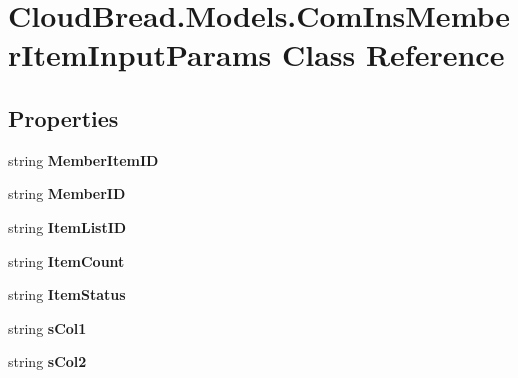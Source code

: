 \hypertarget{a00050}{}\section{Cloud\+Bread.\+Models.\+Com\+Ins\+Member\+Item\+Input\+Params Class Reference}
\label{a00050}
\subsection*{Properties}
\begin{DoxyCompactItemize}
\item 
string {\bfseries Member\+Item\+ID}\hypertarget{a00050_a3fea6cfe5f10ea9cf6c86f6f6ba63970}{}\label{a00050_a3fea6cfe5f10ea9cf6c86f6f6ba63970}

\item 
string {\bfseries Member\+ID}\hypertarget{a00050_a08770abad05bca194bb16c216680e0d2}{}\label{a00050_a08770abad05bca194bb16c216680e0d2}

\item 
string {\bfseries Item\+List\+ID}\hypertarget{a00050_aa1ccce901aa780f842db85153fa40849}{}\label{a00050_aa1ccce901aa780f842db85153fa40849}

\item 
string {\bfseries Item\+Count}\hypertarget{a00050_a7463ab9c8c9b0941b55ec993a1b43954}{}\label{a00050_a7463ab9c8c9b0941b55ec993a1b43954}

\item 
string {\bfseries Item\+Status}\hypertarget{a00050_a13818e61f93c09d342efe1b81017e800}{}\label{a00050_a13818e61f93c09d342efe1b81017e800}

\item 
string {\bfseries s\+Col1}\hypertarget{a00050_affa03051a794e6a9948a866b3de936cd}{}\label{a00050_affa03051a794e6a9948a866b3de936cd}

\item 
string {\bfseries s\+Col2}\hypertarget{a00050_a71f3b049f44ec447f545a16c1cafe651}{}\label{a00050_a71f3b049f44ec447f545a16c1cafe651}


\end{DoxyCompactItemize}
